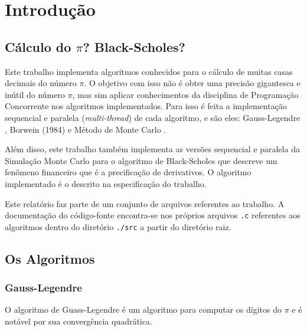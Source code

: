 \section{Introdução}

\subsection{Cálculo do $\pi$? Black-Scholes?}

Este trabalho implementa algoritmos conhecidos para o cálculo de muitas casas decimais do número $\pi$. O objetivo com isso não é obter uma precisão gigantesca e inútil do número $\pi$, mas sim aplicar conhecimentos da disciplina de Programação Concorrente nos algoritmos implementados. Para isso é feita a implementação sequencial e paralela (\emph{multi-thread}) de cada algoritmo, e são eles: Gauss-Legendre \cite{gauss-legendre}, Borwein (1984) \cite{borwein} e Método de Monte Carlo \cite{monte-carlo}.

Além disso, este trabalho também implementa as versões sequencial e paralela da Simulação Monte Carlo para o algoritmo de Black-Scholes \cite{bs} que descreve um fenômeno financeiro que é a precificação de derivativos. O algoritmo implementado é o descrito na especificação do trabalho.

Este relatório faz parte de um conjunto de arquivos referentes ao trabalho. A documentação do código-fonte encontra-se nos próprios arquivos \texttt{.c} referentes aos algoritmos dentro do diretório \texttt{./src} a partir do diretório raiz.

\subsection{Os Algoritmos}

\subsubsection{Gauss-Legendre}

O algoritmo de Guass-Legendre é um algoritmo para computar os dígitos do $\pi$ e é notável por sua convergência quadrática.

